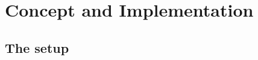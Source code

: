 \chapter{Concept and Implementation}
\label{chap:concept}

\begin{comment}
Super loop:
1. Fetch current control value and feedback from system
2. Calculate new output value accordingly
3. Adjust output (PWM)

PD or PDI Control?


Bare-metal vs
Preempt-RT vs
linux
\end{comment}

\section{The setup}